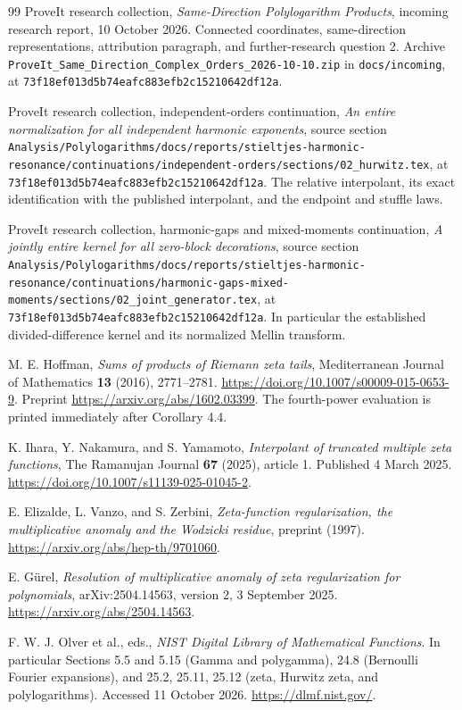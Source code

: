 \documentclass[11pt,a4paper]{article}
\numberwithin{equation}{section}
\theoremstyle{plain}
\theoremstyle{definition}
\theoremstyle{remark}
\newcommand{\src}[1]{\nolinkurl{#1}}
\newcommand{\sourcepin}{\texttt{73f18ef013d5b74eafc883efb2c15210642df12a}}
\begin{document}
\begin{thebibliography}{99}
ProveIt research collection, \emph{Same-Direction Polylogarithm Products},
incoming research report, 10 October 2026.  Connected coordinates,
same-direction representations, attribution paragraph, and
further-research question 2.
Archive \src{ProveIt_Same_Direction_Complex_Orders_2026-10-10.zip}
in \src{docs/incoming}, at \sourcepin.

ProveIt research collection, independent-orders continuation,
\emph{An entire normalization for all independent harmonic exponents},
source section
\src{Analysis/Polylogarithms/docs/reports/stieltjes-harmonic-resonance/continuations/independent-orders/sections/02_hurwitz.tex},
at \sourcepin.  The relative interpolant, its exact identification
with the published interpolant, and the endpoint and stuffle laws.

ProveIt research collection, harmonic-gaps and mixed-moments continuation,
\emph{A jointly entire kernel for all zero-block decorations},
source section
\src{Analysis/Polylogarithms/docs/reports/stieltjes-harmonic-resonance/continuations/harmonic-gaps-mixed-moments/sections/02_joint_generator.tex},
at \sourcepin.  In particular the established divided-difference
kernel and its normalized Mellin transform.

M. E. Hoffman, \emph{Sums of products of Riemann zeta tails},
Mediterranean Journal of Mathematics \textbf{13} (2016), 2771--2781.
\url{https://doi.org/10.1007/s00009-015-0653-9}.
Preprint \url{https://arxiv.org/abs/1602.03399}.
The fourth-power evaluation is printed immediately after Corollary 4.4.

K. Ihara, Y. Nakamura, and S. Yamamoto,
\emph{Interpolant of truncated multiple zeta functions},
The Ramanujan Journal \textbf{67} (2025), article 1.
Published 4 March 2025.
\url{https://doi.org/10.1007/s11139-025-01045-2}.

E. Elizalde, L. Vanzo, and S. Zerbini,
\emph{Zeta-function regularization, the multiplicative anomaly and
the Wodzicki residue}, preprint (1997).
\url{https://arxiv.org/abs/hep-th/9701060}.

E. G\"urel,
\emph{Resolution of multiplicative anomaly of zeta regularization for
polynomials}, arXiv:2504.14563, version 2, 3 September 2025.
\url{https://arxiv.org/abs/2504.14563}.

F. W. J. Olver et al., eds., \emph{NIST Digital Library of Mathematical
Functions}.  In particular Sections 5.5 and 5.15 (Gamma and polygamma),
24.8 (Bernoulli Fourier expansions), and 25.2, 25.11, 25.12 (zeta,
Hurwitz zeta, and polylogarithms).  Accessed 11 October 2026.
\url{https://dlmf.nist.gov/}.

\end{thebibliography}

\end{document}
